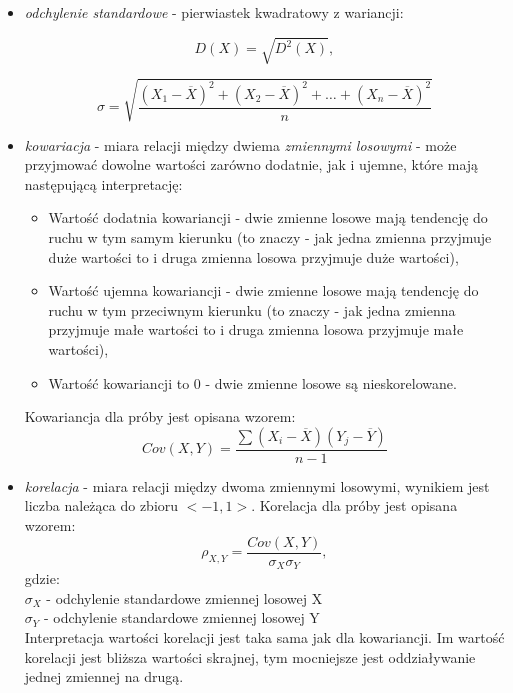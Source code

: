\documentclass[magister]{dyplom}
\begin{document}
\begin{itemize}
\item \textit{odchylenie standardowe} - pierwiastek kwadratowy z wariancji: \newline

\begin{equation}
	D(X) = \sqrt{D^2(X)},
\end{equation}

\begin{equation}
	\sigma = \sqrt{\frac{(X_1 - \overline{X})^2 + (X_2 - \overline{X})^2 + \dots + (X_n - \overline{X})^2}{n}}
\end{equation}
\newpage
\item \textit{kowariacja} - miara relacji między dwiema \textit{zmiennymi losowymi} - może przyjmować dowolne wartości zarówno dodatnie, jak i ujemne, które mają następującą interpretację:
\begin{itemize}
	\item Wartość dodatnia kowariancji - dwie zmienne losowe mają tendencję do ruchu w tym samym kierunku (to znaczy - jak jedna zmienna przyjmuje duże wartości to i druga zmienna losowa przyjmuje duże wartości),
	\item Wartość ujemna kowariancji - dwie zmienne losowe mają tendencję do ruchu w tym przeciwnym kierunku (to znaczy - jak jedna zmienna przyjmuje małe wartości to i druga zmienna losowa przyjmuje małe wartości),
	\item Wartość kowariancji to 0 - dwie zmienne losowe są nieskorelowane.
\end{itemize}

Kowariancja dla próby jest opisana wzorem:
\begin{equation}
	Cov(X,Y) = \frac{\sum(X_i - \overline{X})(Y_j - \overline{Y})}{n - 1}
\end{equation}

\item \textit{korelacja} - miara relacji między dwoma zmiennymi losowymi, wynikiem jest liczba należąca do zbioru $<-1,1>$. Korelacja dla próby jest opisana wzorem:
\begin{equation}
	\rho_{X,Y} = \frac{Cov(X,Y)}{\sigma_X\sigma_Y},
\end{equation}
gdzie:\\
$\sigma_X$ - odchylenie standardowe zmiennej losowej X\\
$\sigma_Y$ - odchylenie standardowe zmiennej losowej Y\\

Interpretacja wartości korelacji jest taka sama jak dla kowariancji. Im wartość korelacji jest bliższa wartości skrajnej, tym mocniejsze jest oddziaływanie jednej zmiennej na drugą.\\


\end{itemize}
\end{document}
